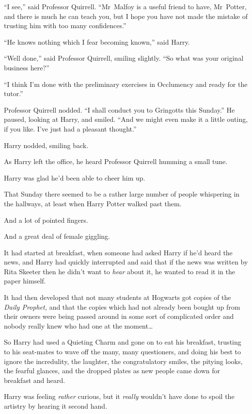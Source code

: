 “I see,” said Professor Quirrell. “Mr~Malfoy is a useful friend to have, Mr~Potter, and there is much he can teach you, but I hope you have not made the mistake of trusting him with too many confidences.”

“He knows nothing which I fear becoming known,” said Harry.

“Well done,” said Professor Quirrell, smiling slightly. “So what was your original business here?”

“I think I’m done with the preliminary exercises in Occlumency and ready for the tutor.”

Professor Quirrell nodded. “I shall conduct you to Gringotts this Sunday.” He paused, looking at Harry, and smiled. “And we might even make it a little outing, if you like. I’ve just had a pleasant thought.”

Harry nodded, smiling back.

As Harry left the office, he heard Professor Quirrell humming a small tune.

Harry was glad he’d been able to cheer him up.

\later

That Sunday there seemed to be a rather large number of people whispering in the hallways, at least when Harry Potter walked past them.

And a lot of pointed fingers.

And a great deal of female giggling.

It had started at breakfast, when someone had asked Harry if he’d heard the news, and Harry had quickly interrupted and said that if the news was written by Rita Skeeter then he didn’t want to \emph{hear} about it, he wanted to read it in the paper himself.

It had then developed that not many students at Hogwarts got copies of the \emph{Daily Prophet,} and that the copies which had not already been bought up from their owners were being passed around in some sort of complicated order and nobody really knew who had one at the moment…

So Harry had used a Quieting Charm and gone on to eat his breakfast, trusting to his seat-mates to wave off the many, many questioners, and doing his best to ignore the incredulity, the laughter, the congratulatory smiles, the pitying looks, the fearful glances, and the dropped plates as new people came down for breakfast and heard.

Harry was feeling \emph{rather} curious, but it \emph{really} wouldn’t have done to spoil the artistry by hearing it second hand.

